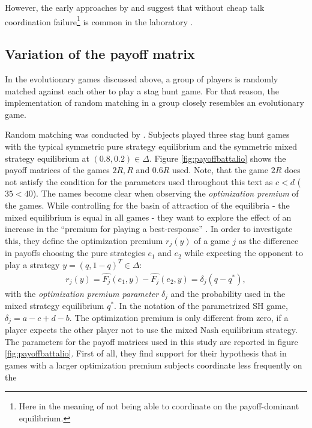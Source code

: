 However, the 
early approaches by \textcite{cooper_communication_1992} and
\textcite{van_huyck_tacit_1990} suggest that without cheap talk 
coordination failure\footnote{Here in the meaning of not being 
able to coordinate on the payoff-dominant equilibrium.} 
is common in the laboratory \parencite[2]{devetag_when_2007}. 

\subsection{Variation of the payoff matrix}
In the evolutionary games discussed above, a group of players is randomly
matched against each other to play a stag hunt game. For that reason, the
implementation of random matching in a group closely resembles an 
evolutionary game.

Random matching was conducted by \textcite{battalio_optimization_2001}. 
Subjects played three stag hunt games with the typical symmetric pure strategy
equilibrium and the symmetric mixed strategy equilibrium at $(0.8,0.2) \in
\Delta$. Figure \ref{fig:payoffbattalio} shows the payoff matrices of the
games $2R, R$ and $0.6R$ used. Note, that the game $2R$ does not satisfy the
condition for the parameters used throughout this text as $c<d$ ($35<40$).
The names become clear when observing the 
\textit{optimization premium} of the games. While controlling for the basin of 
attraction of the equilibria - the mixed equilibrium is equal in all games -
they want to explore the effect of an increase in the ``premium for playing
a best-response'' \parencite[751]{battalio_optimization_2001}. 
In order to investigate this, they define the optimization premium $r_j(y)$ of 
a game $j$ as the difference in payoffs choosing the pure strategies 
$e_1$ and $e_2$ while expecting the opponent to play a strategy 
$y=(q,1-q)^T \in \Delta$:
\begin{align}
        r_j(y)= \hat{F_j}(e_1,y) - \hat{F_j}(e_2,y) = \delta_j(q-q^*),
\end{align}
with the \textit{optimization premium parameter} $\delta_j$ and the 
probability used in the mixed strategy equilibrium $q^*$. In the notation
of the parametrized SH game, $\delta_j = a - c + d - b$. The optimization
premium is only different from zero, if a player expects the other player not
to use the mixed Nash equilibrium strategy.
The parameters for the payoff matrices used in this study 
are reported in figure \ref{fig:payoffbattalio}. 
First of all, they find support for their hypothesis that in games with a 
larger optimization premium subjects coordinate less frequently on the 
